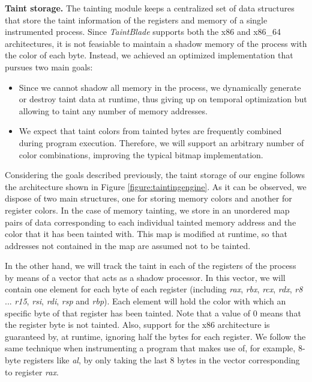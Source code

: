\documentclass[conference]{IEEEtran}
\begin{document}
\textbf{Taint storage.} The tainting module keeps a centralized set
of data structures that store the taint information of the registers and memory of
a single instrumented process.
Since \textit{TaintBlade} supports both the x86 and x86\_64 architectures, it is not feasiable to
maintain a shadow memory of the process with the color of each byte. Instead, we
achieved an optimized implementation that pursues two main goals:
\begin{itemize}
    \item Since we cannot shadow all memory in the process, we dynamically generate or
          destroy taint data at runtime, thus giving up on temporal optimization but
          allowing to taint any number of memory addresses.
    \item We expect that taint colors from tainted bytes are frequently combined during
          program execution. Therefore, we will support an arbitrary number of color
          combinations, improving the typical bitmap implementation.
\end{itemize}

Considering the goals described previously, the taint storage of our engine
follows the architecture shown in Figure \ref{figure:taintingengine}. As it can
be observed, we dispose of two main structures, one for storing memory colors
and another for register colors. In the case of memory tainting, we store in an
unordered map pairs of data corresponding to each individual tainted memory
address and the color that it has been tainted with. This map is modified at
runtime, so that addresses not contained in the map are assumed not to be
tainted.

In the other hand, we will track the taint in each of the registers of the
process by means of a vector that acts as a shadow processor. In this vector,
we will contain one element for each byte of each register (including
\textit{rax}, \textit{rbx}, \textit{rcx}, \textit{rdx}, \textit{r8} ...
\textit{r15}, \textit{rsi}, \textit{rdi}, \textit{rsp} and \textit{rbp}). Each
element will hold the color with which an specific byte of that register has
been tainted. Note that a value of 0 means that the register byte is not
tainted. Also, support for the x86 architecture is guaranteed by, at runtime,
ignoring half the bytes for each register. We follow the same technique when
instrumenting a program that makes use of, for example, 8-byte registers like
\textit{al}, by only taking the last 8 bytes in the vector corresponding to
register \textit{rax}.
\end{document}
